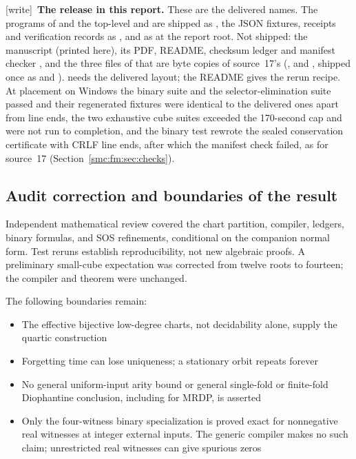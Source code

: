 \documentclass[11pt,letterpaper]{article}
\numberwithin{equation}{section}
\theoremstyle{definition}
\theoremstyle{remark}
\newcommand{\wtag}{\textup{[write]}}
\begin{document}
\wtag\ \textbf{The release in this report.} These are the delivered names. The programs of  and the top-level  and  are shipped as , the JSON fixtures, receipts and verification records as , and  as  at the report root. Not shipped: the manuscript (printed here), its PDF, README, checksum ledger and manifest checker , and the three files of  that are byte copies of source~17's (,  and , shipped once as  and ).  needs the delivered layout; the README gives the rerun recipe. At placement on Windows the binary suite and the selector-elimination suite passed and their regenerated fixtures were identical to the delivered ones apart from line ends, the two exhaustive cube suites exceeded the 170-second cap and were not run to completion, and the binary test rewrote the sealed conservation certificate with CRLF line ends, after which the manifest check failed, as for source~17 (Section~\ref{smc:fm:sec:checks}).

\subsection{Audit correction and boundaries of the result}
Independent mathematical review covered the chart partition, compiler,
ledgers, binary formulas, and SOS refinements, conditional on the companion
normal form. Test reruns establish reproducibility, not new algebraic proofs.
A preliminary small-cube expectation was corrected from twelve roots to
fourteen; the compiler and theorem were unchanged.

The following boundaries remain:
\begin{itemize}
\item The effective bijective low-degree charts, not decidability alone,
supply the quartic construction
\item Forgetting time can lose uniqueness; a stationary orbit repeats forever
\item No general uniform-input arity bound or general single-fold or
finite-fold Diophantine conclusion, including for MRDP, is asserted
\item Only the four-witness binary specialization is proved exact for
nonnegative real witnesses at integer external inputs. The generic compiler
makes no such claim; unrestricted real witnesses can give spurious zeros
\end{itemize}
\end{document}
